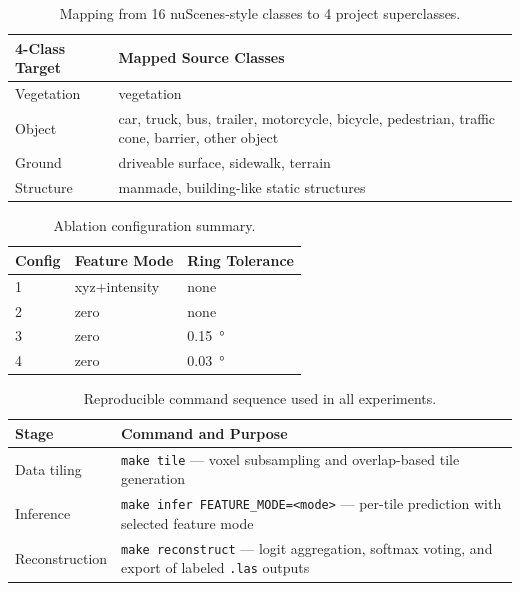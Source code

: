 \documentclass[12pt, a4paper]{report}
\begin{document}
\begin{table}[h]
\centering
\caption{Mapping from 16 nuScenes-style classes to 4 project superclasses.}
\label{tab:class-map}
\begin{tabular}{|p{3.2cm}|p{10.3cm}|}
\hline
\textbf{4-Class Target} & \textbf{Mapped Source Classes} \\
\hline
Vegetation & vegetation \\
Object & car, truck, bus, trailer, motorcycle, bicycle, pedestrian, traffic cone, barrier, other object \\
Ground & driveable surface, sidewalk, terrain \\
Structure & manmade, building-like static structures \\
\hline
\end{tabular}
\end{table}

\begin{table}[h]
\centering
\caption{Ablation configuration summary.}
\label{tab:config-summary}
\begin{tabular}{|l|l|l|}
\hline
\textbf{Config} & \textbf{Feature Mode} & \textbf{Ring Tolerance} \\
\hline
1 & xyz+intensity & none \\
2 & zero & none \\
3 & zero & \SI{0.15}{\degree} \\
4 & zero & \SI{0.03}{\degree} \\
\hline
\end{tabular}
\end{table}

\begin{table}[h]
\centering
\caption{Reproducible command sequence used in all experiments.}
\label{tab:repro-commands}
\begin{tabular}{|p{3.2cm}|p{8.8cm}|}
\hline
\textbf{Stage} & \textbf{Command and Purpose} \\
\hline
Data tiling & \texttt{make tile} --- voxel subsampling and overlap-based tile generation \\
Inference & \texttt{make infer FEATURE\_MODE=<mode>} --- per-tile prediction with selected feature mode \\
Reconstruction & \texttt{make reconstruct} --- logit aggregation, softmax voting, and export of labeled \texttt{.las} outputs \\
\hline
\end{tabular}
\end{table}
\end{document}
